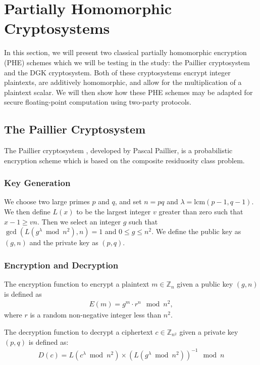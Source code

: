 \section{Partially Homomorphic Cryptosystems}

In this section, we will present two classical partially homomorphic encryption (PHE) schemes which we will be testing in the study: the Paillier cryptosystem and the DGK cryptosystem. Both of these cryptosystems encrypt integer plaintexts, are additively homomorphic, and allow for the multiplication of a plaintext scalar. We will then show how these PHE schemes may be adapted for secure floating-point computation using two-party protocols. 

\subsection{The Paillier Cryptosystem}
The Paillier cryptosystem \cite{stern_public-key_1999}, developed by Pascal Paillier, is a probabilistic encryption scheme which is based on the composite residuosity class problem.

\subsubsection{Key Generation}
We choose two large primes $p$ and $q$, and set $n = pq $ and $ \lambda = \mathrm{lcm}\left(p-1,q-1\right)$.
We then define $L\left(x\right)$ to be the largest integer $v$ greater than zero such that $x-1 \geq vn$.
Then we select an integer $g$ such that $\gcd\left(L\left(g^\lambda \bmod n^2\right), n\right) = 1$ and $0\leq g \leq n^2$.
We define the public key as $(g,n)$ and the private key as $(p,q)$.

\subsubsection{Encryption and Decryption}
The encryption function to encrypt a plaintext $m \in \mathbb{Z}_n$ given a public key $(g,n)$ is defined as
\begin{align*}
  E(m) = g^m \cdot r^n \mod{n^2},
\end{align*}
where $r$ is a random non-negative integer less than $n^2$.

The decryption function to decrypt a ciphertext $c \in \mathbb{Z}_{n^2}$ given a private key $(p,q)$ is defined as:
\begin{align*}
  D(c) = L(c^\lambda \bmod n^2) \times (L(g^\lambda \bmod n^2))^{-1} \mod n
\end{align*}

